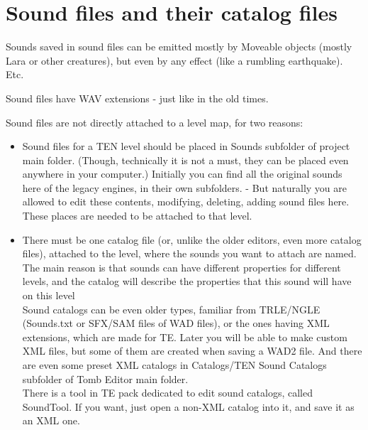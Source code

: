 \section{Sound files and their catalog files}
Sounds saved in sound files can be emitted mostly by Moveable objects (mostly Lara or other creatures), but even by any effect (like a rumbling earthquake). Etc.
\par Sound files have WAV extensions - just like in the old times.
\par Sound files are not directly attached to a level map, for two reasons:
\begin{itemize}
    \item Sound files for a TEN level should be placed in Sounds subfolder of project main folder. (Though, technically it is not a must, they can be placed even anywhere in your computer.) Initially you can find all the original sounds here of the legacy engines, in their own subfolders. - But naturally you are allowed to edit these contents, modifying, deleting, adding sound files here. \\ These places are needed to be attached to that level.
    \item There must be one catalog file (or, unlike the older editors, even more catalog files), attached to the level, where the sounds you want to attach are named. The main reason is that sounds can have different properties for different levels, and the catalog will describe the properties that this sound will have on this level \\ Sound catalogs can be even older types, familiar from TRLE/NGLE (Sounds.txt or SFX/SAM files of WAD files), or the ones having XML extensions, which are made for TE. Later you will be able to make custom XML files, but some of them are created when saving a WAD2 file. And there are even some preset XML catalogs in Catalogs/TEN Sound Catalogs subfolder of Tomb Editor main folder. \\ There is a tool in TE pack dedicated to edit sound catalogs, called SoundTool. If you want, just open a non-XML catalog into it, and save it as an XML one.
\end{itemize}
